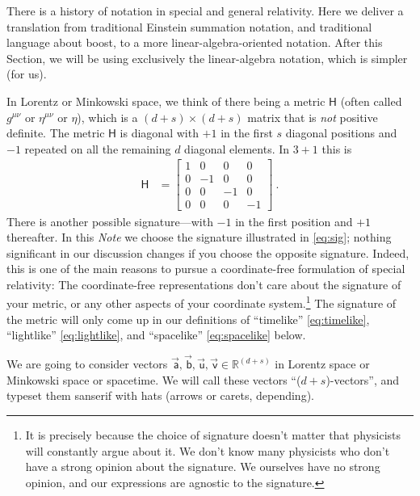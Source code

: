 \documentclass{article}
\newcommand{\metric}{\mathsf{H}}
\newcommand\upvec[1]{\!\vec{\,\mathrm{#1}}}
\newcommand{\Lvec}[1]{\upvec{\mathsf{#1}}} %
\newcommand{\plus}{\!+\!} %
\newcommand{\documentname}{\textsl{Note}}
\begin{document}
There is a history of notation in special and general relativity.
Here we deliver a translation from traditional Einstein summation notation, and traditional language about boost, to a more linear-algebra-oriented notation.
After this Section, we will be using exclusively the linear-algebra notation, which is simpler (for us).

In Lorentz or Minkowski space, we think of there being a metric $\metric$ (often called $g^{\mu\nu}$ or $\eta^{\mu\nu}$ or $\eta$), which is a $(d+s)\times(d+s)$ matrix that is \emph{not} positive definite.
The metric $\metric$ is diagonal with $+1$ in the first $s$ diagonal positions and $-1$ repeated on all the remaining $d$ diagonal elements.
In $3\plus1$ this is
\begin{align}\label{eq:sig}
    \metric &= \begin{bmatrix}1 & 0 & 0 & 0\\
                              0 & -1 & 0 & 0\\
                              0 & 0 & -1 & 0\\
                              0 & 0 & 0 & -1\end{bmatrix} ~.
\end{align}
There is another possible signature---with $-1$ in the first position and $+1$ thereafter.
In this \documentname{} we choose the signature illustrated in \eqref{eq:sig}; nothing significant in our discussion changes if you choose the opposite signature.
Indeed, this is one of the main reasons to pursue a coordinate-free formulation of special relativity:
The coordinate-free representations don't care about the signature of your metric, or any other aspects of your coordinate system.\footnote{It is precisely because the choice of signature doesn't matter that physicists will constantly argue about it. We don't know many physicists who don't have a strong opinion about the signature. We ourselves have no strong opinion, and our expressions are agnostic to the signature.}
The signature of the metric will only come up in our definitions of ``timelike'' \eqref{eq:timelike}, ``lightlike'' \eqref{eq:lightlike}, and ``spacelike'' \eqref{eq:spacelike} below.

We are going to consider vectors $\Lvec{a}, \Lvec{b}, \Lvec{u}, \Lvec{v}\in\mathbb{R}^{(d+s)}$ in Lorentz space or Minkowski space or spacetime.
We will call these vectors ``($d\plus s$)-vectors'', and typeset them sanserif with hats (arrows or carets, depending).
\end{document}
